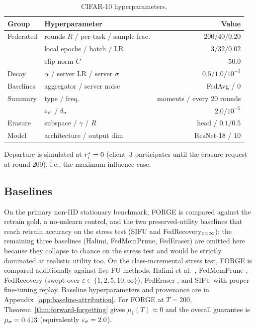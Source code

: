 \begin{table}[t]
\centering
\scriptsize
\setlength{\tabcolsep}{3pt}
\begin{tabular}{llr}
\toprule
Group & Hyperparameter & Value \\
\midrule
Federated & rounds $R$ / per-task / sample frac. & $200/40/0.20$ \\
          & local epochs / batch / LR & $3/32/0.02$ \\
          & clip norm $C$ & $50.0$ \\
\midrule
Decay   & $\alpha$ / server LR / server $\sigma$ & $0.5 / 1.0 / 10^{-3}$ \\
\midrule
Baselines & aggregator / server noise & FedAvg / $0$ \\
\midrule
Summary & type / freq. & moments / every 20 rounds \\
        & $\varepsilon_\sigma$ / $\delta_\sigma$ & $2.0 / 10^{-5}$ \\
\midrule
Erasure & subspace / $\gamma$ / $R$ & head / $0.1 / 0.5$ \\
\midrule
Model   & architecture / output dim & ResNet-18 / $10$ \\
\bottomrule
\end{tabular}
\caption{CIFAR-10 hyperparameters.}
\label{tab:hyperparameters}
\end{table}

Departure is simulated at $r_i^{\star} = 0$ (client~3 participates until the erasure
request at round 200), i.e., the maximum-influence case.

\subsection{Baselines}
\label{sec:experiments-baselines}

On the primary non-IID stationary benchmark, FORGE is compared against the
retrain gold, a no-unlearn control, and the two preserved-utility baselines
that reach retrain accuracy on the stress test (SIFU and
FedRecovery$_{\varepsilon=\infty}$); the remaining three baselines (Halimi,
FedMemPrune, FedEraser) are omitted here because they collapse to chance on
the stress test and would be strictly dominated at realistic utility too.
On the class-incremental stress test, FORGE is compared additionally against
five FU methods: Halimi et al.\
\cite{halimi2022}, FedMemPrune \cite{wei2026fedmemprune}, FedRecovery
\cite{zhang2023fedrecovery} (swept over $\varepsilon \in \{1, 2, 5, 10, \infty\}$),
FedEraser \cite{liu2021federaser}, and SIFU \cite{fraboni2024sifu} with proper
fine-tuning replay. Baseline hyperparameters and provenance are in
Appendix~\ref{app:baseline-attribution}. For FORGE at $T=200$,
Theorem~\ref{thm:forward-forgetting} gives $\mu_1(T) \approx 0$ and the overall
guarantee is $\mu_\sigma = 0.413$ (equivalently $\varepsilon_\sigma = 2.0$).

